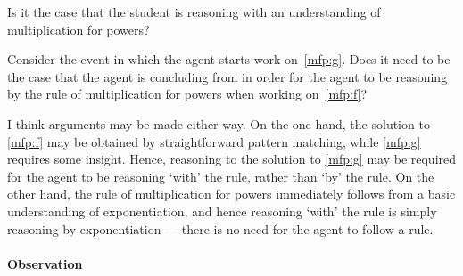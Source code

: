 \begin{note}
  Is it the case that the student is reasoning with an understanding of multiplication for powers?

  Consider the event in which the agent starts work on~\ref{mfp:g}.
  Does it need to be the case that the agent is concluding  from  in order for the agent to be reasoning by the rule of multiplication for powers when working on~\ref{mfp:f}?

  I think arguments may be made either way.
  On the one hand, the solution to \ref{mfp:f} may be obtained by straightforward pattern matching, while \ref{mfp:g} requires some insight.
  Hence, reasoning to the solution to \ref{mfp:g} may be required for the agent to be reasoning `with' the rule, rather than `by' the rule.
  On the other hand, the rule of multiplication for powers immediately follows from a basic understanding of exponentiation, and hence reasoning `with' the rule is simply reasoning by exponentiation --- there is no need for the agent to follow a rule.
\end{note}

\paragraph*{Observation}

